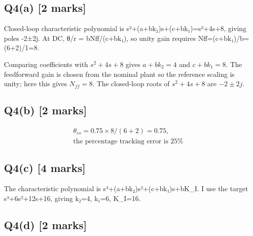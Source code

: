 \documentclass[11pt,a4paper]{article}
\begin{document}
\subsection*{Q4(a) \hfill [2 marks]}

Closed-loop characteristic polynomial is s²+(a+bk₂)s+(c+bk₁)=s²+4s+8, giving poles -2±2j.
At DC, θ/r = bNff/(c+bk₁), so unity gain requires Nff=(c+bk₁)/b=(6+2)/1=8.\par\smallskip Comparing coefficients with $s^2+4s+8$ gives $a+bk_2=4$ and $c+bk_1=8$. The feedforward gain is chosen from the nominal plant so the reference scaling is unity; here this gives $N_{ff}=8$. The closed-loop roots of $s^2+4s+8$ are $-2\pm2j$.

\subsection*{Q4(b) \hfill [2 marks]}

\[\begin{aligned}\theta_{ss} = 0.75\times8/(6+2)=0.75,\\ \text{the percentage tracking error is 25\%}\end{aligned}\]

\subsection*{Q4(c) \hfill [4 marks]}

The characteristic polynomial is s³+(a+bk₂)s²+(c+bk₁)s+bK\_I.
I use the target s³+6s²+12s+16, giving k₂=4, k₁=6, K\_I=16.

\subsection*{Q4(d) \hfill [2 marks]}

\vspace{2mm}
\end{document}

